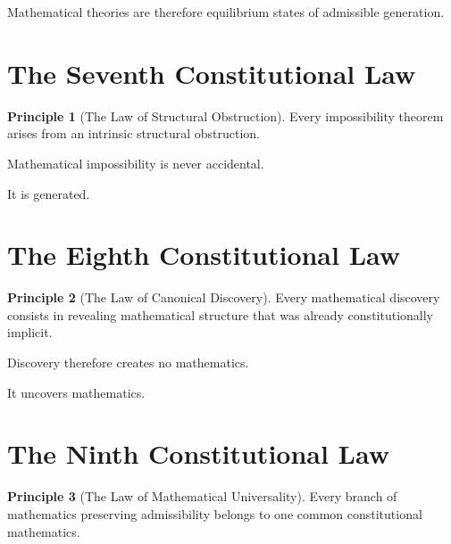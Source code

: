 \documentclass[13pt,openany]{book}
\theoremstyle{plain}
\theoremstyle{definition}
\newtheorem{principle}{Principle}[chapter]
\begin{document}
Mathematical theories are therefore equilibrium states of admissible
generation.

\section{The Seventh Constitutional Law}

\begin{principle}[The Law of Structural Obstruction]

Every impossibility theorem arises from an intrinsic structural obstruction.

\end{principle}

Mathematical impossibility is never accidental.

It is generated.

\section{The Eighth Constitutional Law}

\begin{principle}[The Law of Canonical Discovery]

Every mathematical discovery consists in revealing mathematical structure that
was already constitutionally implicit.

\end{principle}

Discovery therefore creates no mathematics.

It uncovers mathematics.

\section{The Ninth Constitutional Law}

\begin{principle}[The Law of Mathematical Universality]

Every branch of mathematics preserving admissibility belongs to one common
constitutional mathematics.

\end{principle}
\end{document}
